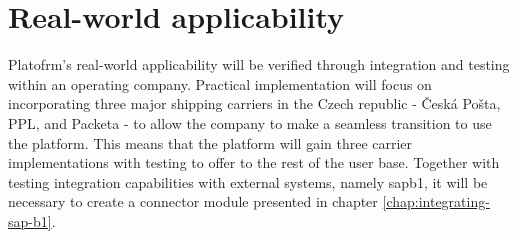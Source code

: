 




\section{Real-world applicability}
\label{sec:real-world-applicability}
Platofrm's real-world applicability will be verified through integration and testing within an operating company.
Practical implementation will focus on incorporating three major shipping carriers in the Czech republic - Česká Pošta, PPL, and Packeta - to allow the company to make a seamless transition to use the platform.
This means that the platform will gain three carrier implementations with testing to offer to the rest of the user base.
Together with testing integration capabilities with external systems, namely \gls{sapb1}, it will be necessary to create a connector module presented in chapter \ref{chap:integrating-sap-b1}.

